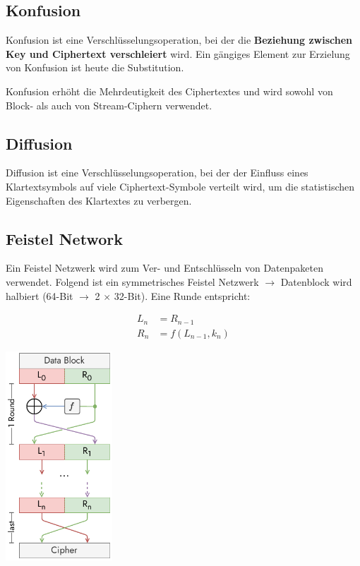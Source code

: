 \documentclass[
  10pt,
  a4paper,
]{article}
\begin{document}
\begin{multicols*}{2}
\subsection{Konfusion}\label{konfusion}

Konfusion ist eine Verschlüsselungsoperation, bei der die
\textbf{Beziehung zwischen Key und Ciphertext verschleiert} wird. Ein
gängiges Element zur Erzielung von Konfusion ist heute die Substitution.

Konfusion erhöht die Mehrdeutigkeit des Ciphertextes und wird sowohl von
Block- als auch von Stream-Ciphern verwendet.

\subsection{Diffusion}\label{diffusion}

Diffusion ist eine Verschlüsselungsoperation, bei der der Einfluss eines
Klartextsymbols auf viele Ciphertext-Symbole verteilt wird, um die
statistischen Eigenschaften des Klartextes zu verbergen.

\subsection{\texorpdfstring{Feistel Network
\href{https://www.youtube.com/watch?v=FGhj3CGxl8I}{\color{BrickRed}\faYoutube}}{Feistel Network }}\label{feistel-network}

Ein Feistel Netzwerk wird zum Ver- und Entschlüsseln von Datenpaketen
verwendet. Folgend ist ein symmetrisches Feistel Netzwerk
\(\rightarrow\) Datenblock wird halbiert (64-Bit \(\rightarrow\) 2
\(\times\) 32-Bit). Eine Runde entspricht:

\[
\begin{split}
  L_n &= R_{n-1}\\
  R_n &= f(L_{n-1},k_n)
\end{split}
\]

\begin{center}
\includegraphics[width=4cm,height=\textheight]{images/crypto/feistel_network.pdf}
\end{center}


\end{multicols*}
\end{document}

